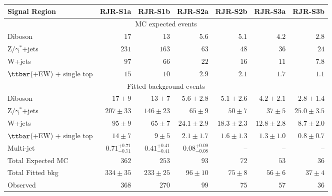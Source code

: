 \clearpage
\begin{table}[H]
\tiny
\begin{center}
\vspace*{-0.035\textwidth}
\begin{tabular}{|lrrrrrr|}
\hline
Signal Region & \textbf{ RJR-S1a } & \textbf{ RJR-S1b } & \textbf{ RJR-S2a } & \textbf{ RJR-S2b } & \textbf{ RJR-S3a } & \textbf{ RJR-S3b } \\
\hline
\multicolumn{7}{|c|}{MC expected events} \\ \hline
Diboson &  $17$               &  $13$               &  $5.6$               &  $5.1$               &  $4.2$               &  $2.8$               \\
$\mathrm{Z/\gamma^{*}}$+jets &  $231$               &  $163$               &  $63$               &  $48$               &  $36$               &  $24$               \\
W+jets &  $97$               &  $66$               &  $22$               &  $16$               &  $11$               &  $7.8$               \\
$\ttbar$(+EW) + single top &  $15$               &  $10$               &  $2.9$               &  $2.1$               &  $1.7$               &  $1.1$               \\
\hline
\multicolumn{7}{|c|}{Fitted background events} \\ \hline
Diboson & $17 \pm 9$ & $13 \pm 7$ & $5.6 \pm 2.8$ & $5.1 \pm 2.6$ & $4.2 \pm 2.1$ & $2.8 \pm 1.4$ \\
$\mathrm{Z/\gamma^{*}}$+jets & $207 \pm 33$ & $146 \pm 23$ & $65 \pm 9$ & $50 \pm 7$ & $37 \pm 5$ & $25.0 \pm 3.5$ \\
W+jets & $95 \pm 9$ & $65 \pm 7$ & $24.1 \pm 2.9$ & $18.3 \pm 2.3$ & $12.8 \pm 2.8$ & $8.7 \pm 2.0$ \\
$\ttbar$(+EW) + single top & $14 \pm 7$ & $9 \pm 5$ & $2.1 \pm 1.7$ & $1.6 \pm 1.3$ & $1.3 \pm 1.0$ & $0.8 \pm 0.7$ \\
Multi-jet &  $0.71_{-0.71}^{+0.71}$               &  $0.41_{-0.41}^{+0.41}$               &  $0.08_{-0.08}^{+0.09}$               & -- & -- & -- \\
\hline
Total Expected MC &  $362$               &  $253$               &  $93$               &  $72$               &  $53$               &  $36$               \\
\hline
Total Fitted bkg & $334 \pm 35$ & $233 \pm 25$ & $96 \pm 10$ & $75 \pm 8$ & $56 \pm 6$ & $37 \pm 4$ \\
\hline
Observed &  $368$                     &  $270$                     &  $99$                     &  $75$                     &  $57$                     &  $36$                     \\
\hline



\end{tabular}
\end{center}
\end{table}
